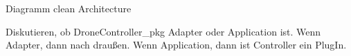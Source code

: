 

Diagramm clean Architecture



Diskutieren, ob DroneController\_pkg Adapter oder Application ist.
Wenn Adapter, dann nach draußen.
Wenn Application, dann ist Controller ein PlugIn.














